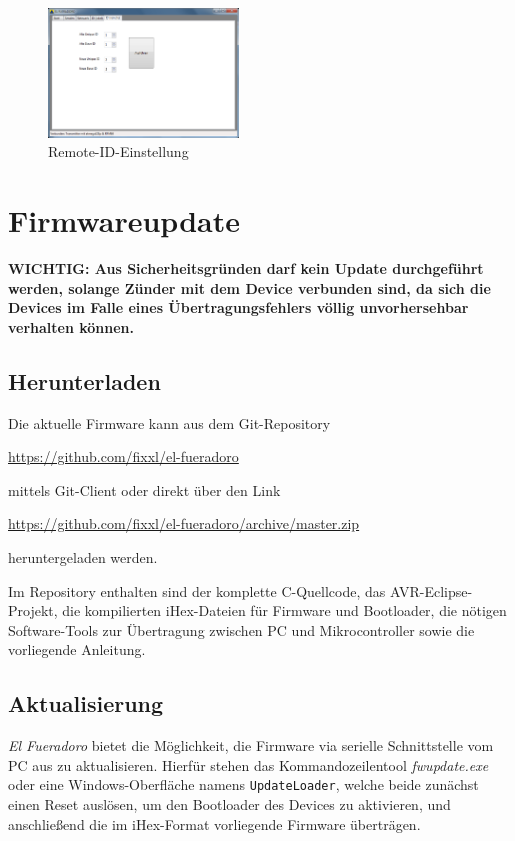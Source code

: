 \documentclass[pdftex, parskip, numbers=noenddot, toc=listof]{scrbook}
\newcommand{\anlage}{\emph{El Fueradoro}}
\begin{document}
	\begin{figure}[!t]
		\centering
		\includegraphics[width=0.45\textwidth]{bilder/gui-remote}
		\caption{Remote-ID-Einstellung}
		\label{fig:gui-remote}
	\end{figure}

	\chapter{Firmwareupdate}
	\label{ch:firmwareupdate}

	\textbf{WICHTIG: Aus Sicherheitsgründen darf kein Update durchgeführt werden, solange Zünder mit dem Device verbunden sind, da sich die Devices im Falle eines Übertragungsfehlers völlig unvorhersehbar verhalten können.}

	\section{Herunterladen}

	Die aktuelle Firmware kann aus dem Git-Repository
	\begin{center}\url{https://github.com/fixxl/el-fueradoro}\end{center}
	mittels Git-Client oder direkt über den Link
	\begin{center}\url{https://github.com/fixxl/el-fueradoro/archive/master.zip}\end{center}
	heruntergeladen werden.

	Im Repository enthalten sind der komplette C-Quellcode, das AVR-Eclipse-Projekt, die kom\-pilierten iHex-Dateien für Firmware und Bootloader, die nötigen Software-Tools zur Übertragung zwischen PC und Mikrocontroller sowie die vorliegende Anleitung.

	\section{Aktualisierung}

	{\anlage} bietet die Möglichkeit, die Firmware via serielle Schnittstelle vom PC aus zu aktualisieren. Hierfür stehen das Kommandozeilentool \emph{fwupdate.exe} oder eine Windows-Oberfläche namens \texttt{UpdateLoader}, welche beide zunächst einen Reset auslösen, um den Bootloader des Devices zu aktivieren, und anschließend die im iHex-Format vorliegende Firmware überträgen.
\end{document}

